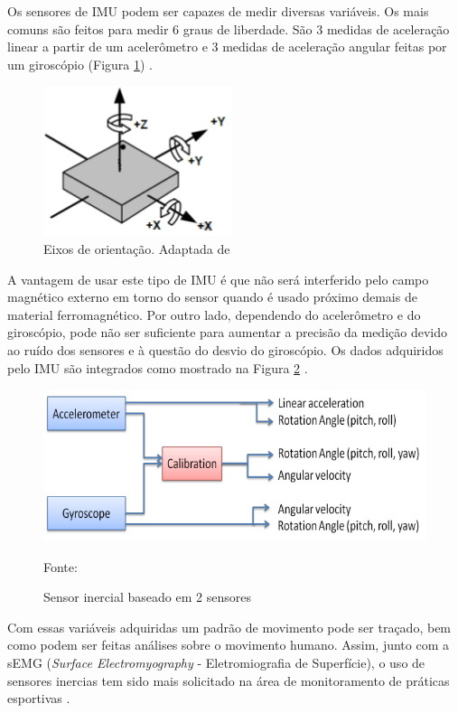 		Os sensores de IMU podem ser capazes de medir diversas variáveis. Os mais comuns são feitos para medir 6 graus de liberdade. São 3 medidas de aceleração linear a partir de um acelerômetro e 3 medidas de aceleração angular feitas por um giroscópio (Figura \ref{eixos_imu}) \cite{santos2016}.
		 
		\begin{figure}[h]
			\centering
			\includegraphics[keepaspectratio=true,scale=0.8]{figuras/Eixos_imu.png}
			\caption{Eixos de orientação. Adaptada de }
			\label{eixos_imu}	
		\end{figure}


		A vantagem de usar este tipo de IMU é que não será interferido pelo campo magnético externo em torno do
		sensor quando é usado próximo demais de material ferromagnético. Por outro lado, dependendo do acelerômetro e do giroscópio, pode não ser suficiente para aumentar a precisão da medição devido ao ruído dos sensores e à questão do desvio do giroscópio. Os dados adquiridos pelo IMU são integrados como mostrado na Figura \ref{integracao_imu} \cite{ahmad2013}.

		\begin{figure}[h]
			\centering
			\includegraphics[keepaspectratio=true,scale=0.5
			]{figuras/integracao_imu.png}
			\caption{Sensor inercial baseado em 2 sensores}
			Fonte: \cite{ahmad2013}
			\label{integracao_imu}
			
		\end{figure}

		Com essas variáveis adquiridas um padrão de movimento pode ser traçado, bem como podem ser feitas análises sobre o movimento humano. Assim, junto com a sEMG (\textit{Surface Electromyography} - Eletromiografia de Superfície), o uso de sensores inercias tem sido mais solicitado na área de monitoramento de práticas esportivas \cite{howard2016}.
		
